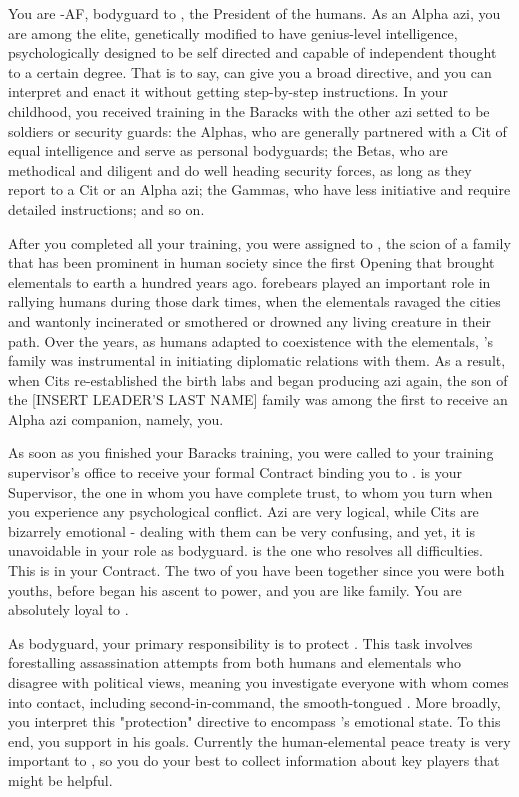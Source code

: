 \documentclass[char]{elementals}
\begin{document}
\name{\cRomeo{}}

You are \cRomeo{\intro}-AF, bodyguard to \cLeader{\intro}, the President of the humans.  As an Alpha azi, you are among the elite, genetically modified to have genius-level intelligence, psychologically designed to be self directed and capable of independent thought to a certain degree.  That is to say, \cLeader{} can give you a broad directive, and you can interpret and enact it without getting step-by-step instructions.  In your childhood, you received training in the Baracks with the other azi setted to be soldiers or security guards: the Alphas, who are generally partnered with a Cit of equal intelligence and serve as personal bodyguards; the Betas, who are methodical and diligent and do well heading security forces, as long as they report to a Cit or an Alpha azi; the Gammas, who have less initiative and require detailed instructions; and so on.

After you completed all your training, you were assigned to \cLeader{}, the scion of a family that has been prominent in human society since the first Opening that brought elementals to earth a hundred years ago.  \cLeader{\Their} forebears played an important role in rallying humans during those dark times, when the elementals ravaged the cities and wantonly incinerated or smothered or drowned any living creature in their path.  Over the years, as humans adapted to coexistence with the elementals, \cLeader{}'s family was instrumental in initiating diplomatic relations with them.  As a result, when Cits re-established the birth labs and began producing azi again, the son of the [INSERT LEADER'S LAST NAME] family was among the first to receive an Alpha azi companion, namely, you.

As soon as you finished your Baracks training, you were called to your training supervisor's office to receive your formal Contract binding you to \cLeader{}.  \cLeader{\They} is your Supervisor, the one in whom you have complete trust, to whom you turn when you experience any psychological conflict.  Azi are very logical, while Cits are bizarrely emotional - dealing with them can be very confusing, and yet, it is unavoidable in your role as bodyguard.  \cLeader{} is the one who resolves all difficulties.  This is in your Contract.  The two of you have been together since you were both youths, before \cLeader{\they} began his ascent to power, and you are like family.  You are absolutely loyal to \cLeader{\them}.

As \cLeader{\their} bodyguard, your primary responsibility is to protect \cLeader{\them}.  This task involves forestalling assassination attempts from both humans and elementals who disagree with 
\cLeader{\their} political views, meaning you investigate everyone with whom \cLeader{\they} comes into contact, including \cLeader{\their} second-in-command, the smooth-tongued \cDema{\intro}.  More broadly, you interpret this "protection" directive to encompass \cLeader{}'s emotional state.  To this end, you support \cLeader{\them} in his goals.  Currently the human-elemental peace treaty is very important to \cLeader{\them}, so you do your best to collect information about key players that might be helpful.
\end{document}
